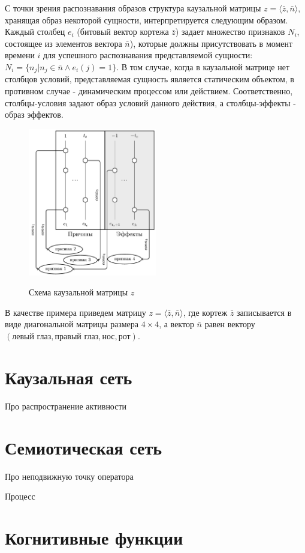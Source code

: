 \documentclass[a4paper,12pt]{article}
\begin{document}
С точки зрения распознавания образов структура каузальной матрицы $z=\langle\bar z, \bar n \rangle$, хранящая образ некоторой сущности, интерпретируется следующим образом. Каждый столбец $e_i$  (битовый вектор кортежа $\bar z$) задает множество признаков $N_i$, состоящее из элементов вектора $\bar n$), которые должны присутствовать в момент времени $i$ для успешного распознавания представляемой сущности: $N_i=\{n_j|n_j\in \bar n \land e_i(j)=1\}$. В том случае, когда в каузальной матрице нет столбцов условий, представляемая сущность является статическим объектом, в противном случае - динамическим процессом или действием. Соответственно, столбцы-условия задают образ условий данного действия, а столбцы-эффекты - образ эффектов.

\begin{figure}[H]
	\centering
	\includegraphics[width=0.5\textwidth]{causnet/caus_matr2_ru.jpg}
	\label{fig:causmatr}
	\caption{Схема каузальной матрицы $z$}
\end{figure}

В качестве примера приведем матрицу $z=\langle \bar z, \bar n\rangle$, где кортеж $\bar z$ записывается в виде диагональной матрицы размера $4\times 4$, а вектор $\bar n$ равен вектору $(\text{левый глаз}, \text{правый глаз}, \text{нос}, \text{рот})$.
\section{Каузальная сеть}
Про распространение активности

\section{Семиотическая сеть}
Про неподвижную точку оператора

\begin{Th}
	Процесс 
\end{Th}

\section{Когнитивные функции}


\nocite{*}
\printbibliography[keyword={strl}, resetnumbers=true]
\end{document}
